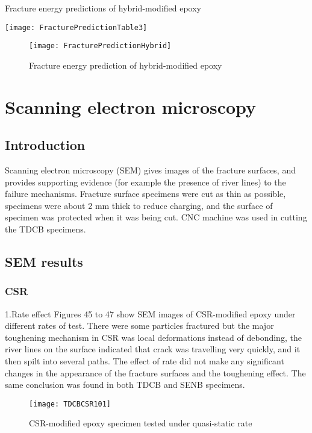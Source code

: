 \documentclass[numbers=noendperiod,chapterprefix=on]{icldt} %
\begin{document}
\begin{table}[!hp]
\centering
\caption{Fracture energy predictions of hybrid-modified epoxy} %
\texttt{[image: FracturePredictionTable3]}
\end{table}

\begin{figure}[!hp]
\centering
\texttt{[image: FracturePredictionHybrid]}
\caption{Fracture energy prediction of hybrid-modified epoxy}
\end{figure}

\section{Scanning electron microscopy }
\subsection{Introduction}

Scanning electron microscopy (SEM) gives images of the fracture surfaces, and provides supporting evidence (for example the presence of river lines) to the failure mechanisms. Fracture surface specimens were cut as thin as possible, specimens were about 2 mm thick to reduce charging, and the surface of specimen was protected when it was being cut. CNC machine was used in cutting the TDCB specimens.

\subsection{SEM results }
\subsubsection{CSR}

1.Rate effect \newline
Figures 45 to 47 show SEM images of CSR-modified epoxy under different rates of test. There were some particles fractured but the major toughening mechanism in CSR was local deformations instead of debonding, the river lines on the surface indicated that crack was travelling very quickly, and it then spilt into several paths. The effect of rate did not make any significant changes in the appearance of the fracture surfaces and the toughening effect. The same conclusion was found in both TDCB and SENB specimens.

\begin{figure}[!htpb]
\centering
\texttt{[image: TDCBCSR101]}
\caption{CSR-modified epoxy specimen tested under quasi-static rate }
\end{figure}
\end{document}
